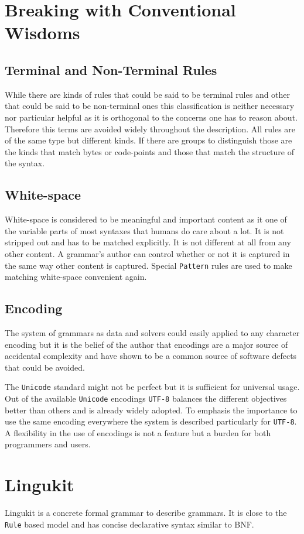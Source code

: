 \documentclass[10pt,a4paper]{article}
\begin{document}
\section{Breaking with Conventional Wisdoms}
\subsection{Terminal and Non-Terminal Rules}
While there are kinds of rules that could be said to be terminal rules and other that could be said to be non-terminal ones this classification is neither necessary nor particular helpful as it is orthogonal to the concerns one has to reason about. Therefore this terms are avoided widely throughout the description. All rules are of the same type but different kinds. If there are groups to distinguish those are the kinds that match bytes or code-points and those that match the structure of the syntax.

\subsection{White-space}
White-space is considered to be meaningful and important content as it one of the variable parts of most syntaxes that humans do care about a lot. It is not stripped out and has to be matched explicitly. It is not different at all from any other content. A grammar's author can control whether or not it is captured in the same way other content is captured. Special \texttt{Pattern} rules are used to make matching white-space convenient again.

\subsection{Encoding}
The system of grammars as data and solvers could easily applied to any character encoding but it is the belief of the author that encodings are a major source of accidental complexity and have shown to be a common source of software defects that could be avoided. 

The \texttt{Unicode} standard might not be perfect but it is sufficient for universal usage. Out of the available \texttt{Unicode} encodings \texttt{UTF-8} balances the different objectives better than others and is already widely adopted. To emphasis the importance to use the same encoding everywhere the system is described particularly for \texttt{UTF-8}. A flexibility in the use of encodings is not a feature but a burden for both programmers and users.

\section{Lingukit}
Lingukit is a concrete formal grammar to describe grammars. It is close to the \texttt{Rule} based model and has concise declarative syntax similar to BNF.

\newpage

\end{document}
